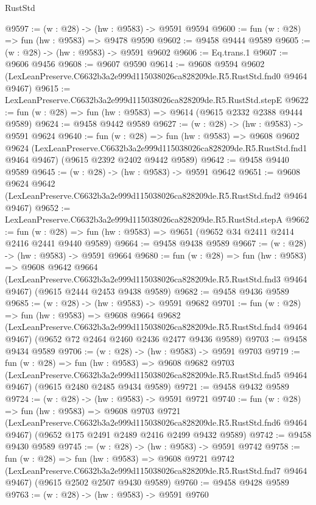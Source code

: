 \begin{lexlean}{RustStd}
\begin{coremodule}
@9597 := (w : @28) -> (hw : @9583) -> @9591 @9594
@9600 := fun (w : @28) => fun (hw : @9583) => @9478 @9590
@9602 := @9458 @9444 @9589
@9605 := (w : @28) -> (hw : @9583) -> @9591 @9602
@9606 := Eq.trans.{1}
@9607 := @9606 @9456
@9608 := @9607 @9590
@9614 := @9608
    @9594
    @9602
    (LexLeanPreserve.C6632b3a2e999d115038026ca828209de.R5.RustStd.fnd0 @9464 @9467)
@9615 := LexLeanPreserve.C6632b3a2e999d115038026ca828209de.R5.RustStd.stepE
@9622 := fun (w : @28) => fun (hw : @9583) => @9614 (@9615 @2332 @2388 @9444 @9589)
@9624 := @9458 @9442 @9589
@9627 := (w : @28) -> (hw : @9583) -> @9591 @9624
@9640 := fun (w : @28) =>
  fun (hw : @9583) =>
  @9608
    @9602
    @9624
    (LexLeanPreserve.C6632b3a2e999d115038026ca828209de.R5.RustStd.fnd1 @9464 @9467)
    (@9615 @2392 @2402 @9442 @9589)
@9642 := @9458 @9440 @9589
@9645 := (w : @28) -> (hw : @9583) -> @9591 @9642
@9651 := @9608
    @9624
    @9642
    (LexLeanPreserve.C6632b3a2e999d115038026ca828209de.R5.RustStd.fnd2 @9464 @9467)
@9652 := LexLeanPreserve.C6632b3a2e999d115038026ca828209de.R5.RustStd.stepA
@9662 := fun (w : @28) => fun (hw : @9583) => @9651 (@9652 @34 @2411 @2414 @2416 @2441 @9440 @9589)
@9664 := @9458 @9438 @9589
@9667 := (w : @28) -> (hw : @9583) -> @9591 @9664
@9680 := fun (w : @28) =>
  fun (hw : @9583) =>
  @9608
    @9642
    @9664
    (LexLeanPreserve.C6632b3a2e999d115038026ca828209de.R5.RustStd.fnd3 @9464 @9467)
    (@9615 @2444 @2453 @9438 @9589)
@9682 := @9458 @9436 @9589
@9685 := (w : @28) -> (hw : @9583) -> @9591 @9682
@9701 := fun (w : @28) =>
  fun (hw : @9583) =>
  @9608
    @9664
    @9682
    (LexLeanPreserve.C6632b3a2e999d115038026ca828209de.R5.RustStd.fnd4 @9464 @9467)
    (@9652 @72 @2464 @2460 @2436 @2477 @9436 @9589)
@9703 := @9458 @9434 @9589
@9706 := (w : @28) -> (hw : @9583) -> @9591 @9703
@9719 := fun (w : @28) =>
  fun (hw : @9583) =>
  @9608
    @9682
    @9703
    (LexLeanPreserve.C6632b3a2e999d115038026ca828209de.R5.RustStd.fnd5 @9464 @9467)
    (@9615 @2480 @2485 @9434 @9589)
@9721 := @9458 @9432 @9589
@9724 := (w : @28) -> (hw : @9583) -> @9591 @9721
@9740 := fun (w : @28) =>
  fun (hw : @9583) =>
  @9608
    @9703
    @9721
    (LexLeanPreserve.C6632b3a2e999d115038026ca828209de.R5.RustStd.fnd6 @9464 @9467)
    (@9652 @175 @2491 @2489 @2416 @2499 @9432 @9589)
@9742 := @9458 @9430 @9589
@9745 := (w : @28) -> (hw : @9583) -> @9591 @9742
@9758 := fun (w : @28) =>
  fun (hw : @9583) =>
  @9608
    @9721
    @9742
    (LexLeanPreserve.C6632b3a2e999d115038026ca828209de.R5.RustStd.fnd7 @9464 @9467)
    (@9615 @2502 @2507 @9430 @9589)
@9760 := @9458 @9428 @9589
@9763 := (w : @28) -> (hw : @9583) -> @9591 @9760

\end{coremodule}
\end{lexlean}
